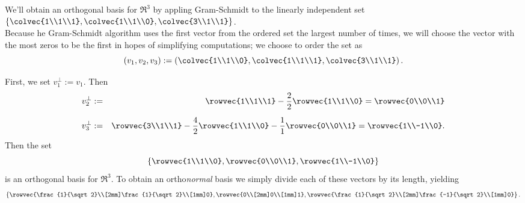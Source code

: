 \begin{example}
We'll  obtain an orthogonal basis for $\Re^3$ by appling Gram-Schmidt to the linearly independent set 
$\left\{\colvec{1\\1\\1}, \colvec{1\\1\\0},\colvec{3\\1\\1} \right\}$.\\

Because he Gram-Schmidt algorithm uses the first vector from the ordered set the largest number of times, we will choose the vector with the most zeros to be the first in hopes of simplifying computations; we choose to order the set as
\[( v_1,v_2,v_3)
:= \left( \colvec{1\\1\\0}, \colvec{1\\1\\1},\colvec{3\\1\\1} \right).\]

First, we set $v_1^\perp:=v_1$.  Then
\begin{eqnarray*}
v_2^\perp&:=& \rowvec{1\\1\\1} - \frac{2}{2}\rowvec{1\\1\\0} = \rowvec{0\\0\\1} \\[2mm]
v_3^\perp&:=& \rowvec{3\\1\\1} - \frac{4}{2}\rowvec{1\\1\\0} - \frac{1}{1}\rowvec{0\\0\\1} = \rowvec{1\\-1\\0}. 
\end{eqnarray*}
Then the set
\[
\left\{ \rowvec{1\\1\\0},\rowvec{0\\0\\1},\rowvec{1\\-1\\0}\right\}
\]
is an orthogonal basis for $\Re^3$.  To obtain an ortho{\it normal} basis we simply divide each of these vectors by its length, yielding
\[
\left\{ \rowvec{\frac{1}{\sqrt2}\\[2mm]\frac{1}{\sqrt2}\\[1mm]0},\rowvec{0\\[2mm]0\\[1mm]1},\rowvec{\frac{1}{\sqrt2}\\[2mm]\frac{-1}{\sqrt2}\\[1mm]0}\right\}.
\]
\end{example}

